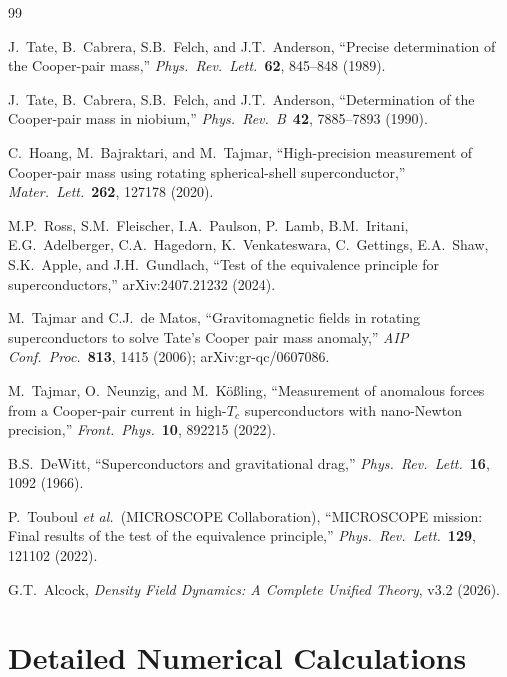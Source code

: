 \documentclass[12pt,a4paper]{article}
\theoremstyle{definition}
\theoremstyle{remark}
\begin{document}
\begin{thebibliography}{99}

J.~Tate, B.~Cabrera, S.B.~Felch, and J.T.~Anderson,
``Precise determination of the Cooper-pair mass,''
\textit{Phys.\ Rev.\ Lett.}\ \textbf{62}, 845--848 (1989).

J.~Tate, B.~Cabrera, S.B.~Felch, and J.T.~Anderson,
``Determination of the Cooper-pair mass in niobium,''
\textit{Phys.\ Rev.\ B}\ \textbf{42}, 7885--7893 (1990).

C.~Hoang, M.~Bajraktari, and M.~Tajmar,
``High-precision measurement of Cooper-pair mass using rotating
spherical-shell superconductor,''
\textit{Mater.\ Lett.}\ \textbf{262}, 127178 (2020).

M.P.~Ross, S.M.~Fleischer, I.A.~Paulson, P.~Lamb, B.M.~Iritani,
E.G.~Adelberger, C.A.~Hagedorn, K.~Venkateswara, C.~Gettings,
E.A.~Shaw, S.K.~Apple, and J.H.~Gundlach,
``Test of the equivalence principle for superconductors,''
arXiv:2407.21232 (2024).

M.~Tajmar and C.J.~de Matos,
``Gravitomagnetic fields in rotating superconductors to solve
Tate's Cooper pair mass anomaly,''
\textit{AIP Conf.\ Proc.}\ \textbf{813}, 1415 (2006);
arXiv:gr-qc/0607086.

M.~Tajmar, O.~Neunzig, and M.~K\"o{\ss}ling,
``Measurement of anomalous forces from a Cooper-pair current in
high-$T_c$ superconductors with nano-Newton precision,''
\textit{Front.\ Phys.}\ \textbf{10}, 892215 (2022).

B.S.~DeWitt,
``Superconductors and gravitational drag,''
\textit{Phys.\ Rev.\ Lett.}\ \textbf{16}, 1092 (1966).

P.~Touboul \textit{et al.}\ (MICROSCOPE Collaboration),
``MICROSCOPE mission: Final results of the test of the equivalence
principle,''
\textit{Phys.\ Rev.\ Lett.}\ \textbf{129}, 121102 (2022).

G.T.~Alcock,
\textit{Density Field Dynamics: A Complete Unified Theory}, v3.2 (2026).

\end{thebibliography}

\appendix
\section{Detailed Numerical Calculations}\label{app:numerics}
\end{document}
